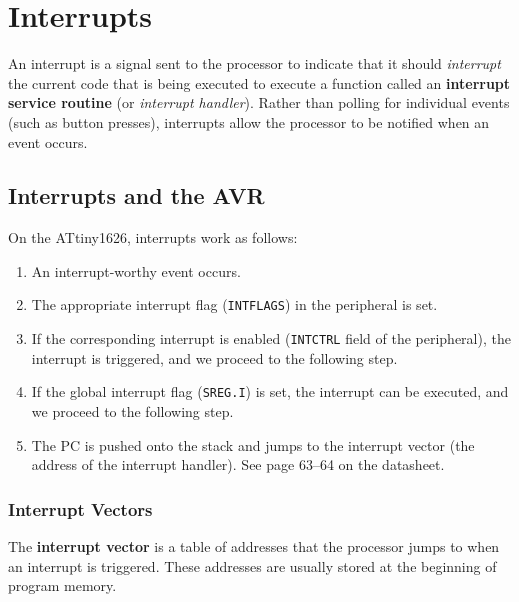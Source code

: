 \documentclass{article}
\begin{document}
\section{Interrupts}
An interrupt is a signal sent to the processor to indicate that it
should \textit{interrupt} the current code that is being executed to
execute a function called an \textbf{interrupt service routine} (or
\textit{interrupt handler}). Rather than polling for individual events
(such as button presses), interrupts allow the processor to be notified
when an event occurs.
\subsection{Interrupts and the AVR}
On the ATtiny1626, interrupts work as follows:
\begin{enumerate}
    \item An interrupt-worthy event occurs.
    \item The appropriate interrupt flag (\texttt{INTFLAGS}) in
          the peripheral is set.
    \item If the corresponding interrupt is enabled
          (\texttt{INTCTRL} field of the peripheral), the
          interrupt is triggered, and we proceed to the following step.
    \item If the global interrupt flag (\texttt{SREG.I}) is set,
          the interrupt can be executed, and we proceed to the
          following step.
    \item The PC is pushed onto the stack and jumps to the interrupt
          vector (the address of the interrupt handler). See page
          63--64 on the datasheet.
\end{enumerate}
\subsubsection{Interrupt Vectors}
The \textbf{interrupt vector} is a table of addresses that the
processor jumps to when an interrupt is triggered. These addresses are
usually stored at the beginning of program memory.
\end{document}
